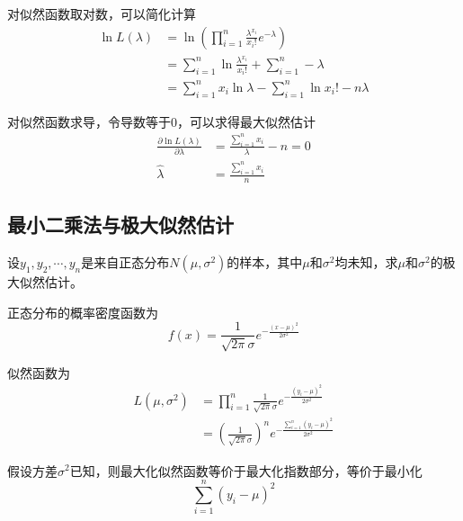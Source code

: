 对似然函数取对数，可以简化计算
\begin{equation}
    \begin{aligned}
        \ln L(\lambda) & = \ln \left(\prod_{i=1}^n \frac{\lambda^{x_i}}{x_i!}e^{-\lambda}\right)      \\
                       & = \sum_{i=1}^n \ln \frac{\lambda^{x_i}}{x_i!} + \sum\limits_{i=1}^n -\lambda \\
                       & = \sum_{i=1}^n x_i \ln \lambda - \sum\limits_{i=1}^n \ln x_i! - n\lambda
    \end{aligned}
\end{equation}

对似然函数求导，令导数等于0，可以求得最大似然估计
\begin{equation}
    \begin{aligned}
        \frac{\partial \ln L(\lambda)}{\partial \lambda} & = \frac{\sum\limits_{i=1}^n x_i}{\lambda} - n = 0 \\
        \hat{\lambda }                                   & = \frac{\sum\limits_{i=1}^n x_i}{n}
    \end{aligned}
\end{equation}

\subsection{最小二乘法与极大似然估计}

设$y_1,y_2,\cdots,y_n$是来自正态分布$N(\mu,\sigma^2)$的样本，其中$\mu$和$\sigma^2$均未知，求$\mu$和$\sigma^2$的极大似然估计。

正态分布的概率密度函数为
\begin{equation}
    f(x) = \frac{1}{\sqrt{2\pi}\sigma}e^{-\frac{(x-\mu)^2}{2\sigma^2}}
\end{equation}

似然函数为
\begin{equation}
    \begin{aligned}
        L(\mu,\sigma^2) & = \prod_{i=1}^n \frac{1}{\sqrt{2\pi}\sigma}e^{-\frac{
        (y_i-\mu)^2}{2\sigma^2}}                                                  \\
                        & = \left(\frac{1}{\sqrt{2\pi}\sigma}\right)^n e^{-\frac{
                    \sum\limits_{i=1}^n(y_i-\mu)^2}{2\sigma^2}}
    \end{aligned}
\end{equation}

假设方差$\sigma^2$已知，则最大化似然函数等价于最大化指数部分，等价于最小化
\begin{equation}
    \sum_{i=1}^n(y_i-\mu)^2
\end{equation}

